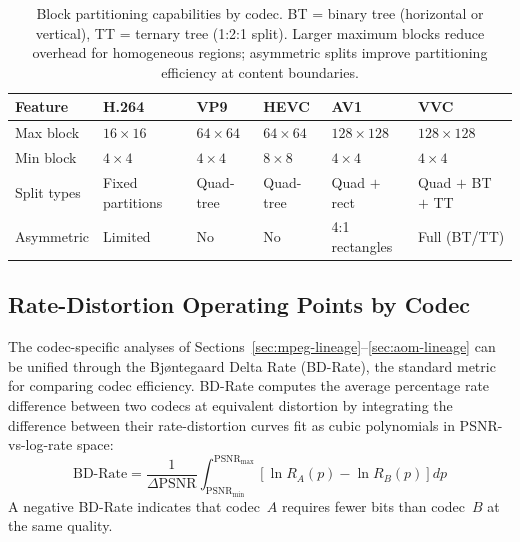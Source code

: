 \begin{table}[ht]
\centering
\small
\renewcommand{\arraystretch}{1.4}
\begin{tabularx}{\textwidth}{lXXXXX}
\toprule
\textbf{Feature} & \textbf{H.264} & \textbf{VP9} & \textbf{HEVC}
  & \textbf{AV1} & \textbf{VVC} \\
\midrule
Max block &
  $16\!\times\!16$ &
  $64\!\times\!64$ &
  $64\!\times\!64$ &
  $128\!\times\!128$ &
  $128\!\times\!128$ \\
Min block &
  $4\!\times\!4$ &
  $4\!\times\!4$ &
  $8\!\times\!8$ &
  $4\!\times\!4$ &
  $4\!\times\!4$ \\
Split types &
  Fixed partitions &
  Quad-tree &
  Quad-tree &
  Quad $+$ rect &
  Quad $+$ BT $+$ TT \\
Asymmetric &
  Limited &
  No &
  No &
  4:1 rectangles &
  Full (BT/TT) \\
\bottomrule
\end{tabularx}
\caption{Block partitioning capabilities by codec. BT = binary tree
  (horizontal or vertical), TT = ternary tree (1:2:1 split). Larger maximum
  blocks reduce overhead for homogeneous regions; asymmetric splits improve
  partitioning efficiency at content boundaries.}
\label{tab:partitioning}
\end{table}

\subsection{Rate-Distortion Operating Points by Codec}
\label{sec:rd-comparison}

The codec-specific analyses of
Sections~\ref{sec:mpeg-lineage}--\ref{sec:aom-lineage} can be unified
through the Bj\o ntegaard Delta Rate (BD-Rate), the standard metric for
comparing codec efficiency. BD-Rate computes the average percentage rate
difference between two codecs at equivalent distortion by integrating the
difference between their rate-distortion curves fit as cubic polynomials in
PSNR-vs-log-rate space:
\begin{equation}
  \text{BD-Rate} = \frac{1}{\Delta\text{PSNR}}
    \int_{\text{PSNR}_{\min}}^{\text{PSNR}_{\max}}
    \left[ \ln R_A(p) - \ln R_B(p) \right] dp
  \label{eq:bd-rate}
\end{equation}
A negative BD-Rate indicates that codec~$A$ requires fewer bits than
codec~$B$ at the same quality.

